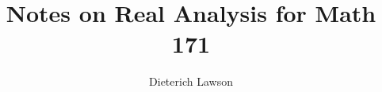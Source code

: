 \documentclass[12pt]{article}
\title{Notes on Real Analysis for Math 171}
\author{Dieterich Lawson}
\begin{document}
\maketitle
\tableofcontents
\listoftodos
\newpage

\newpage

\newpage

\newpage

\newpage

\newpage

\end{document}
